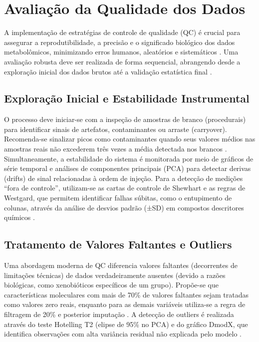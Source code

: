 \section{\textbf{Avaliação da Qualidade dos Dados}}

A implementação de estratégias de controle de qualidade (QC) é crucial para assegurar a reprodutibilidade, a precisão e o significado biológico dos dados metabolômicos, minimizando erros humanos, aleatórios e sistemáticos \cite{QUINTAS2018137, doi:10.1021/acs.analchem.3c03660}. Uma avaliação robusta deve ser realizada de forma sequencial, abrangendo desde a exploração inicial dos dados brutos até a validação estatística final \cite{QUINTAS2018137, doi:10.1021/acs.analchem.3c03660}.

\subsection{Exploração Inicial e Estabilidade Instrumental}

O processo deve iniciar-se com a inspeção de amostras de branco (procedurais) para identificar sinais de artefatos, contaminantes ou arraste (carryover). Recomenda-se sinalizar picos como contaminantes quando seus valores médios nas amostras reais não excederem três vezes a média detectada nos brancos \cite{doi:10.1021/acs.analchem.3c03660}. Simultaneamente, a estabilidade do sistema é monitorada por meio de gráficos de série temporal e análises de componentes principais (PCA) para detectar derivas (drifts) de sinal relacionadas à ordem de injeção. Para a detecção de medições ``fora de controle'', utilizam-se as cartas de controle de Shewhart e as regras de Westgard, que permitem identificar falhas súbitas, como o entupimento de colunas, através da análise de desvios padrão (±SD) em compostos descritores químicos \cite{doi:10.1021/acs.analchem.3c03660}.

\subsection{Tratamento de Valores Faltantes e Outliers}

Uma abordagem moderna de QC diferencia valores faltantes (decorrentes de limitações técnicas) de dados verdadeiramente ausentes (devido a razões biológicas, como xenobióticos específicos de um grupo). Propõe-se que características moleculares com mais de 70\% de valores faltantes sejam tratadas como valores zero reais, enquanto para as demais variáveis utiliza-se a regra de filtragem de 20\% e posterior imputação \cite{doi:10.1021/acs.analchem.3c03660}. A detecção de outliers é realizada através do teste Hotelling T2 (elipse de 95\% no PCA) e do gráfico DmodX, que identifica observações com alta variância residual não explicada pelo modelo \cite{doi:10.1021/acs.analchem.3c03660}.

